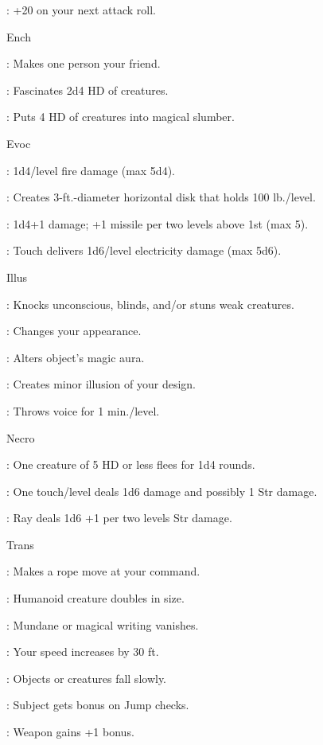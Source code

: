 : +20 on your next attack roll.

Ench

: Makes one person your friend.

: Fascinates 2d4 HD of creatures.

: Puts 4 HD of creatures into magical slumber.

Evoc

: 1d4/level fire damage (max 5d4).

: Creates 3-ft.-diameter horizontal disk that holds 100 lb./level.

: 1d4+1 damage; +1 missile per two levels above 1st (max 5).

: Touch delivers 1d6/level electricity damage (max 5d6).

Illus

: Knocks unconscious, blinds, and/or stuns weak creatures.

: Changes your appearance.

: Alters object's magic aura.

: Creates minor illusion of your design.

: Throws voice for 1 min./level.

Necro

: One creature of 5 HD or less flees for 1d4 rounds.

: One touch/level deals 1d6 damage and possibly 1 Str damage.

: Ray deals 1d6 +1 per two levels Str damage.

Trans

: Makes a rope move at your command.

: Humanoid creature doubles in size.

: Mundane or magical writing vanishes.

: Your speed increases by 30 ft.

: Objects or creatures fall slowly.

: Subject gets bonus on Jump checks.

: Weapon gains +1 bonus.

